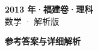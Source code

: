 \documentclass[zihao=-4, a4paper]{ctexart}
\begin{document}
\begin{center}
  {\Large\bfseries 2013 年·福建卷·理科}\\[4pt]
  {\large 数学 · 解析版}
\end{center}
\medskip
{}

\clearpage
{}
\begin{center}{\Large\bfseries 参考答案与详细解析}\end{center}
\medskip

\end{document}
